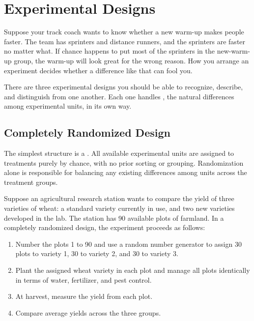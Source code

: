 \chapter{Experimental Designs}


Suppose your track coach wants to know whether a new warm-up makes
people faster. The team has sprinters and distance runners, and the
sprinters are faster no matter what. If chance happens to put most of the
sprinters in the new-warm-up group, the warm-up will look great for the
wrong reason. How you arrange an experiment decides whether a difference
like that can fool you.

There are three experimental designs you should be able to recognize, describe, and distinguish from one another. Each one handles , the natural differences among experimental units, in its own way.

\section{Completely Randomized Design}

The simplest structure is a . All available experimental units are assigned to treatments purely by chance, with no prior sorting or grouping. Randomization alone is responsible for balancing any existing differences among units across the treatment groups.

Suppose an agricultural research station wants to compare the yield of three varieties of wheat: a standard variety currently in use, and two new varieties developed in the lab. The station has 90 available plots of farmland. In a completely randomized design, the experiment proceeds as follows:

\begin{enumerate}
    \item Number the plots 1 to 90 and use a random number generator to assign 30 plots to variety 1, 30 to variety 2, and 30 to variety 3.
    \item Plant the assigned wheat variety in each plot and manage all plots identically in terms of water, fertilizer, and pest control.
    \item At harvest, measure the yield from each plot.
    \item Compare average yields across the three groups.
\end{enumerate}

